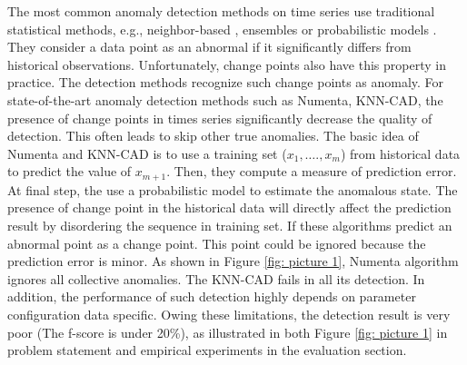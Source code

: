 \par The most common anomaly detection methods on time series use traditional statistical methods, e.g., neighbor-based \cite{chandola2009anomaly}\cite{Breunig:2000:LID:335191.335388}\cite{tang2001robust}\cite{kriegel2009loop}, ensembles \cite{skyline}\cite{Pevny2016} or probabilistic models \cite{burnaev2016conformalized}\cite{ahmad2017unsupervised}. They consider a data point as an abnormal if it significantly differs from historical observations. Unfortunately, change points also have this property in practice. The detection methods recognize such change points as anomaly. For state-of-the-art anomaly detection methods such as Numenta\cite{ahmad2017unsupervised}, KNN-CAD\cite{burnaev2016conformalized}, the presence of change points in times series significantly decrease the quality of detection. This often leads to skip other true anomalies. The basic idea of Numenta and KNN-CAD is to use a training set ($x_1, …., x_m$) from historical data to predict the value of $x_{m+1}$. Then, they compute a measure of prediction error. At final step, the use a probabilistic model to estimate the anomalous state. The presence of change point in the historical data will directly affect the prediction result by disordering the sequence in training set. If these algorithms predict an abnormal point as a change point. This point could be ignored because the prediction error is minor. As shown in Figure \ref{fig: picture 1}, Numenta algorithm ignores all collective anomalies. The KNN-CAD fails in all its detection.
In addition, the performance of such detection highly depends on parameter configuration data specific. Owing these limitations, the detection result is very poor (The f-score is under 20\%), as illustrated in both Figure \ref{fig: picture 1} in problem statement and empirical experiments in the evaluation section.\\


